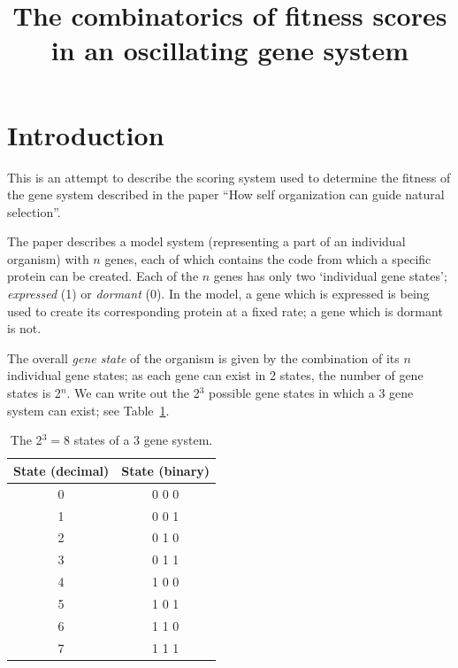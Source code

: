 \documentclass[11pt, a4paper]{article}
\title {
  The combinatorics of fitness scores in an oscillating gene system
}
\date{} %
\author{\Authors}
\begin{document}
\setlength{\droptitle}{-1.8cm} %
\maketitle

\vspace{-1.8cm} %

\section{Introduction}

This is an attempt to describe the scoring system used to determine
the fitness of the gene system described in the paper ``How self
organization can guide natural selection''.

The paper describes a model system (representing a part of an
individual organism) with $n$ genes, each of which contains the code
from which a specific protein can be created. Each of the $n$ genes
has only two `individual gene states'; \emph{expressed} (1)
or \emph{dormant} (0). In the model, a gene which is expressed is
being used to create its corresponding protein at a fixed rate; a gene
which is dormant is not.

The overall \emph{gene state} of the organism is given by the
combination of its $n$ individual gene states; as each gene can exist
in 2 states, the number of gene states is 2$^n$. We can write out the 2$^3$
possible gene states in which a 3 gene system can exist; see
Table~\ref{tab:states}.

\begin{table}[h!]
  \begin{center}
    \caption{The 2$^3 = \mathrm{8}$ states of a 3 gene system.}
    \label{tab:states}
    \begin{tabular}{c|c}
      \textbf{State (decimal)} & \textbf{State (binary)} \\
      \hline
      0 & 0 0 0\\
      1 & 0 0 1\\
      2 & 0 1 0\\
      3 & 0 1 1\\
      4 & 1 0 0\\
      5 & 1 0 1\\
      6 & 1 1 0\\
      7 & 1 1 1\\
    \end{tabular}
  \end{center}
\end{table}
\end{document}
